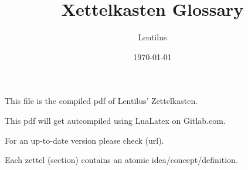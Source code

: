 \documentclass{article}
\title{Xettelkasten Glossary}
\author{Lentilus}
\date{\today}
\begin{document}
\maketitle

\begin{mdframed}
   This file is the compiled pdf of Lentilus' Zettelkasten.

   This pdf will get autcompiled using LuaLatex on Gitlab.com.

   For an up-to-date version please check (url).

   Each zettel (section) contains an atomic idea/concept/definition.

\end{mdframed}
\newpage

\end{document}
